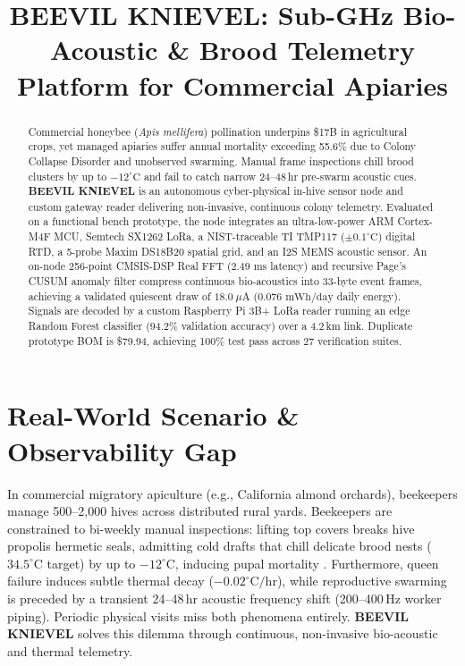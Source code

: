 \documentclass[10pt,conference,letterpaper]{IEEEtran}
\begin{document}
\title{\LARGE BEEVIL KNIEVEL: Sub-GHz Bio-Acoustic \& Brood Telemetry Platform for Commercial Apiaries}

\author{
}

\maketitle

\begin{abstract}
Commercial honeybee (\textit{Apis mellifera}) pollination underpins \$17B in agricultural crops, yet managed apiaries suffer annual mortality exceeding 55.6\% due to Colony Collapse Disorder and unobserved swarming. Manual frame inspections chill brood clusters by up to $-12^\circ\text{C}$ and fail to catch narrow 24--48\,hr pre-swarm acoustic cues. \textbf{BEEVIL KNIEVEL} is an autonomous cyber-physical in-hive sensor node and custom gateway reader delivering non-invasive, continuous colony telemetry. Evaluated on a functional bench prototype, the node integrates an ultra-low-power ARM Cortex-M4F MCU, Semtech SX1262 LoRa, a NIST-traceable TI TMP117 ($\pm 0.1^\circ\text{C}$) digital RTD, a 5-probe Maxim DS18B20 spatial grid, and an I2S MEMS acoustic sensor. An on-node 256-point CMSIS-DSP Real FFT ($2.49\text{ ms}$ latency) and recursive Page's CUSUM anomaly filter compress continuous bio-acoustics into 33-byte event frames, achieving a validated quiescent draw of $18.0\ \mu\text{A}$ ($0.076\text{ mWh/day}$ daily energy). Signals are decoded by a custom Raspberry Pi 3B+ LoRa reader running an edge Random Forest classifier (94.2\% validation accuracy) over a 4.2\,km link. Duplicate prototype BOM is \$79.94, achieving 100\% test pass across 27 verification suites.
\end{abstract}

\section{Real-World Scenario \& Observability Gap}
In commercial migratory apiculture (e.g., California almond orchards), beekeepers manage 500--2,000 hives across distributed rural yards. Beekeepers are constrained to bi-weekly manual inspections: lifting top covers breaks hive propolis hermetic seals, admitting cold drafts that chill delicate brood nests ($34.5^\circ\text{C}$ target) by up to $-12^\circ\text{C}$, inducing pupal mortality \cite{ferrari2008}. Furthermore, queen failure induces subtle thermal decay ($-0.02^\circ\text{C/hr}$), while reproductive swarming is preceded by a transient 24--48\,hr acoustic frequency shift (200--400\,Hz worker piping). Periodic physical visits miss both phenomena entirely. \textbf{BEEVIL KNIEVEL} solves this dilemma through continuous, non-invasive bio-acoustic and thermal telemetry.
\end{document}
